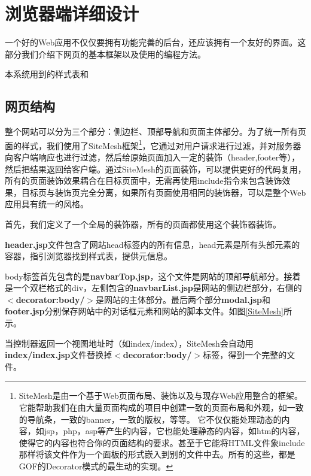 \section{浏览器端详细设计}
一个好的Web应用不仅仅要拥有功能完善的后台，还应该拥有一个友好的界面。这部分我们介绍下网页的基本框架以及使用的编程方法。

本系统用到的样式表和
\subsection{网页结构}

整个网站可以分为三个部分：侧边栏、顶部导航和页面主体部分。为了统一所有页面的样式，我们使用了SiteMesh框架\footnote{SiteMesh是由一个基于Web页面布局、装饰以及与现存Web应用整合的框架。它能帮助我们在由大量页面构成的项目中创建一致的页面布局和外观，如一致的导航条，一致的banner，一致的版权，等等。 它不仅仅能处理动态的内容，如jsp，php，asp等产生的内容，它也能处理静态的内容，如htm的内容，使得它的内容也符合你的页面结构的要求。甚至于它能将HTML文件象include那样将该文件作为一个面板的形式嵌入到别的文件中去。所有的这些，都是GOF的Decorator模式的最生动的实现。}，它通过对用户请求进行过滤，并对服务器向客户端响应也进行过滤，然后给原始页面加入一定的装饰（header,footer等），然后把结果返回给客户端。通过SiteMesh的页面装饰，可以提供更好的代码复用，所有的页面装饰效果耦合在目标页面中，无需再使用include指令来包含装饰效果，目标页与装饰页完全分离，如果所有页面使用相同的装饰器，可以是整个Web应用具有统一的风格。

首先，我们定义了一个全局的装饰器，所有的页面都使用这个装饰器装饰。



\textbf{header.jsp}文件包含了网站head标签内的所有信息，head元素是所有头部元素的容器，指引浏览器找到样式表，提供元信息。


body标签首先包含的是\textbf{navbarTop.jsp}，这个文件是网站的顶部导航部分。接着是一个双栏格式的div，左侧包含的\textbf{navbarList.jsp}是网站的侧边栏部分，右侧的\textbf{$<$decorator:body/$>$}是网站的主体部分。最后两个部分\textbf{modal.jsp}和\textbf{footer.jsp}分别保存网站中的对话框元素和网站的脚本文件。如图\ref{SiteMesh}所示。

当控制器返回一个视图地址时（如index/index），SiteMesh会自动用\textbf{index/index.jsp}文件替换掉\textbf{$<$decorator:body/$>$}标签，得到一个完整的文件。


